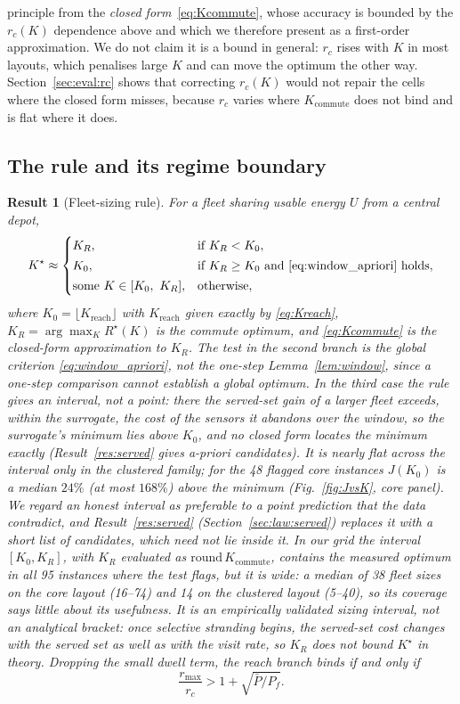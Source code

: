 \documentclass[journal,outdir=./]{IEEEtran}
\newtheorem{result}{Result}
\newcommand{\Kr}{K_{\mathrm{reach}}}
\newcommand{\Kc}{K_{\mathrm{commute}}}
\newcommand{\rmax}{r_{\max}}
\newcommand{\rc}{r_{c}}
\newcommand{\Pbar}{\bar{P}}
\newcommand{\Pf}{P_{f}}
\begin{document}
principle from the \emph{closed form}~\eqref{eq:Kcommute}, whose accuracy is bounded by the $\rc(K)$ dependence above and which we therefore present as a first-order approximation. We do not claim it is a bound in general: $\rc$ rises with $K$ in most layouts, which penalises large $K$ and can move the optimum the other way. Section~\ref{sec:eval:rc} shows that correcting $\rc(K)$ would not repair the cells where the closed form misses, because $\rc$ varies where $\Kc$ does not bind and is flat where it does.

\subsection{The rule and its regime boundary}
\begin{result}[Fleet-sizing rule]\label{thm:law}
For a fleet sharing usable energy $U$ from a central depot,
\begin{equation}\label{eq:law}
K^{\star}\approx
\begin{cases}
K_R, & \text{if } K_R<K_0,\\[2pt]
K_0, & \text{if } K_R\ge K_0 \text{ and \eqref{eq:window_apriori} holds},\\[2pt]
\text{some } K\in[K_0,\ K_R], & \text{otherwise},
\end{cases}
\end{equation}
where $K_0=\lfloor\Kr\rfloor$ with $\Kr$ given exactly by \eqref{eq:Kreach}, $K_R=\arg\max_KR^{\star}(K)$ is the commute optimum, and \eqref{eq:Kcommute} is the closed-form approximation to $K_R$. The test in the second branch is the \emph{global} criterion \eqref{eq:window_apriori}, not the one-step Lemma~\ref{lem:window}, since a one-step comparison cannot establish a global optimum. In the third case the rule gives an interval, not a point: there the served-set gain of a larger fleet exceeds, within the surrogate, the cost of the sensors it abandons over the window, so the surrogate's minimum lies above $K_0$, and no closed form locates the minimum exactly (Result~\ref{res:served} gives a-priori candidates). It is nearly flat across the interval only in the clustered family; for the 48 flagged core instances $J(K_0)$ is a median $24\%$ (at most $168\%$) above the minimum (Fig.~\ref{fig:JvsK}, core panel). We regard an honest interval as preferable to a point prediction that the data contradict, and Result~\ref{res:served} (Section~\ref{sec:law:served}) replaces it with a short list of candidates, which need not lie inside it. In our grid the interval $[K_0,K_R]$, with $K_R$ evaluated as $\mathrm{round}\,\Kc$, contains the measured optimum in all 95 instances where the test flags, but it is wide: a median of 38 fleet sizes on the core layout (16--74) and 14 on the clustered layout (5--40), so its coverage says little about its usefulness. It is an empirically validated sizing interval, not an analytical bracket: once selective stranding begins, the served-set cost changes with the served set as well as with the visit rate, so $K_R$ does not bound $K^{\star}$ in theory. Dropping the small dwell term, the reach branch binds if and only if
\begin{equation}\label{eq:boundary}
\frac{\rmax}{\rc}>1+\sqrt{\Pbar/\Pf}.
\end{equation}
\end{result}
\end{document}
